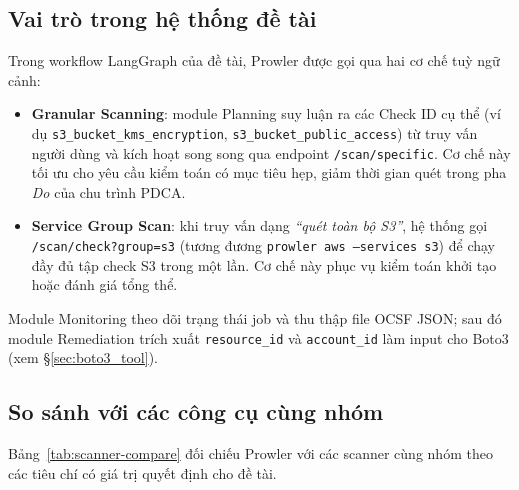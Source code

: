\subsection{Vai trò trong hệ thống đề tài}
\label{subsec:prowler-role}

Trong workflow LangGraph của đề tài, Prowler được gọi qua hai cơ chế tuỳ ngữ cảnh:
\begin{itemize}
  \item \textbf{Granular Scanning}: module Planning suy luận ra các Check ID cụ thể (ví dụ \texttt{s3\_bucket\_kms\_encryption}, \texttt{s3\_bucket\_public\_access}) từ truy vấn người dùng và kích hoạt song song qua endpoint \texttt{/scan/specific}. Cơ chế này tối ưu cho yêu cầu kiểm toán có mục tiêu hẹp, giảm thời gian quét trong pha \textit{Do} của chu trình PDCA.
  \item \textbf{Service Group Scan}: khi truy vấn dạng \textit{``quét toàn bộ S3''}, hệ thống gọi \texttt{/scan/check?group=s3} (tương đương \texttt{prowler aws --services s3}) để chạy đầy đủ tập check S3 trong một lần. Cơ chế này phục vụ kiểm toán khởi tạo hoặc đánh giá tổng thể.
\end{itemize}

Module Monitoring theo dõi trạng thái job và thu thập file OCSF JSON; sau đó module Remediation trích xuất \texttt{resource\_id} và \texttt{account\_id} làm input cho Boto3 (xem §\ref{sec:boto3_tool}).

\subsection{So sánh với các công cụ cùng nhóm}
\label{subsec:prowler-compare}

Bảng~\ref{tab:scanner-compare} đối chiếu Prowler với các scanner cùng nhóm theo các tiêu chí có giá trị quyết định cho đề tài.

